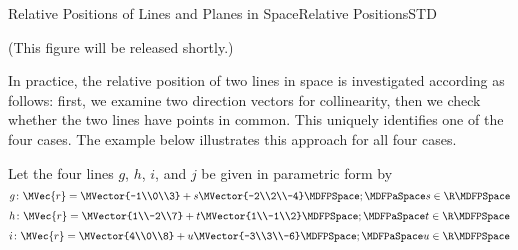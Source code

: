 \begin{MXContent}{Relative Positions of Lines and Planes in Space}{Relative Positions}{STD}
\begin{MInfo}
(This figure will be released shortly.)
\end{MInfo}

In practice, the relative position of two lines in space is investigated 
according as follows: first, we examine two direction vectors 
for collinearity, then we check whether the two lines have points in common.  
This uniquely identifies one of the four cases. The example below illustrates this approach for all 
four cases.

\begin{MExample}
Let the four lines $g$, $h$, $i$, and $j$ be given in parametric form by
\[
 g\colon\MVec{r}=\MVector{-1\\0\\3}+s\MVector{-2\\2\\-4}\MDFPSpace;\MDFPaSpace s\in\R \MDFPSpace
\]
\[
 h\colon\MVec{r}=\MVector{1\\-2\\7}+t\MVector{1\\-1\\2} \MDFPSpace;\MDFPaSpace t\in\R \MDFPSpace
\]
\[
 i\colon\MVec{r}=\MVector{4\\0\\8}+u\MVector{-3\\3\\-6} \MDFPSpace;\MDFPaSpace u\in\R \MDFPSpace
\]


\end{MExample}
\end{MXContent}
